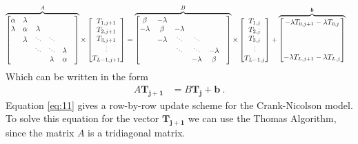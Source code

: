 \documentclass[a4paper]{article} %
\newcommand{\sddots}{\scalebox{0.75}{$\ddots$}}
\newcommand{\svdots}{\scalebox{0.75}{$\vdots$}}
\begin{document}
\begin{align*}
\overbrace{
\begin{bmatrix}
     \alpha & \lambda & & & & \\
     \lambda & \alpha & \lambda & & & \\ 
     & \lambda & \sddots & \sddots & & \\ 
     & & \sddots & \sddots & \lambda \\
     & & & \lambda & \alpha \\
\end{bmatrix}
}^{A}
\times
\begin{bmatrix}
     T_{1,j+1} \\
     T_{2,j+1} \\
     T_{3,j+1} \\
     \svdots \\
     T_{L-1,j+1} \\
\end{bmatrix}
&=
\overbrace{
\begin{bmatrix}
     \beta & -\lambda & & & & \\
     -\lambda & \beta & -\lambda & & & \\ 
     & -\lambda & \sddots & \sddots & & \\ 
     & & \sddots & \sddots & -\lambda \\
     & & & -\lambda & \beta \\
\end{bmatrix}
}^{B}
\times
\begin{bmatrix}
     T_{1,j} \\
     T_{2,j} \\
     T_{3,j} \\
     \svdots \\
     T_{L-1,j} \\
\end{bmatrix} + 
\overbrace{
\begin{bmatrix}
    -\lambda T_{0,j+1} -\lambda T_{0,j} \\
    \\
    \\
    \\
    -\lambda T_{L,j+1} -\lambda T_{L,j} \\
\end{bmatrix}
}^{\bm b}
\end{align*}
Which can be written in the form 
\begin{align}\label{eq:11}
A \bm{T_{j+1}} &= B \bm{T_{j}} + \bm b\ .
\end{align}
Equation \eqref{eq:11} gives a row-by-row update scheme for the Crank-Nicolson model. To solve this equation for the vector $\bm{T_{j+1}}$ we can use the Thomas Algorithm\supercite{thomas}, since the matrix $A$ is a tridiagonal matrix.
\end{document}
